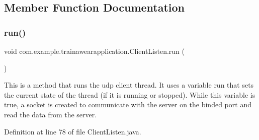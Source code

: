 \subsection{Member Function Documentation}
\mbox{\label{classcom_1_1example_1_1trainawearapplication_1_1_client_listen_adcb69d9825d6d9e182905cf9b4aa4d7d}} 
\subsubsection{\texorpdfstring{run()}{run()}}
{\footnotesize\ttfamily void com.\+example.\+trainawearapplication.\+Client\+Listen.\+run (\begin{DoxyParamCaption}{ }\end{DoxyParamCaption})}

This is a method that runs the udp client thread. It uses a variable run that sets the current state of the thread (if it is running or stopped). While this variable is true, a socket is created to communicate with the server on the binded port and read the data from the server.

Definition at line 78 of file Client\+Listen.\+java.


